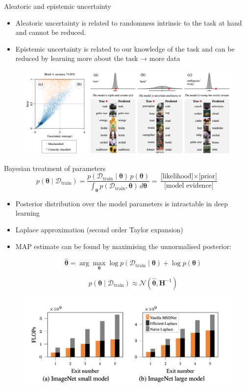 \documentclass[aspectratio=169,xcolor=dvipsnames]{beamer}
\begin{document}
\begin{frame}{Aleatoric and epistemic uncertainty}
    \begin{itemize}
        \item Aleatoric uncertainty is related to randomness intrinsic to the task at hand and cannot be reduced.
        \item Epistemic uncertainty is related to our knowledge of the task and can be reduced by learning more about the task → more data
    \end{itemize}
    \begin{figure}
        \centering
        \includegraphics[width=0.7\linewidth]{figs/Screenshot 2025-04-08 at 15.14.46.png}
        \label{fig:enter-label}
    \end{figure}
\end{frame}

\begin{frame}{Bayesian treatment of parameters}
    \[
        p(\boldsymbol{\theta} \mid \mathcal{D}_{\text{train}})
        = \frac{p(\mathcal{D}_{\text{train}} \mid \boldsymbol{\theta}) \, p(\boldsymbol{\theta})}{\int_{\boldsymbol{\theta}} p(\mathcal{D}_{\text{train}}, \boldsymbol{\theta}) \, d\boldsymbol{\theta}}
        = \frac{\text{[likelihood]} \times \text{[prior]}}{\text{[model evidence]}}
    \]


    \begin{itemize}
        \item Posterior distribution over the model parameters is intractable in deep learning
        \item Laplace approximation (second order Taylor expansion)
        \item MAP estimate can be found by maximising the unnormalised posterior:

              \[
                  \hat{\boldsymbol{\theta}} = \arg\max_{\boldsymbol{\theta}} \log p(\mathcal{D}_{\text{train}} \mid \boldsymbol{\theta}) + \log p(\boldsymbol{\theta})
              \]

              \[
                  p(\boldsymbol{\theta} \mid \mathcal{D}_{\text{train}}) \approx \mathcal{N}(\hat{\boldsymbol{\theta}}, \mathbf{H}^{-1})
              \]
    \end{itemize}
    \begin{figure}
        \centering
        \includegraphics[width=0.5\linewidth]{figs/Screenshot 2025-04-08 at 15.18.50.png}
        \label{fig:enter-label}
    \end{figure}
\end{frame}
\end{document}
